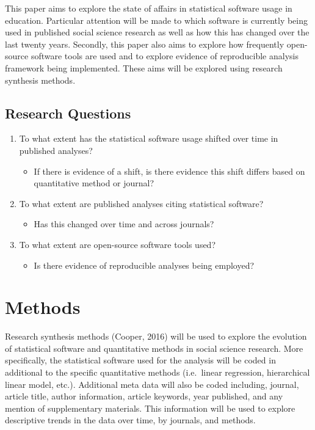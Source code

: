 \documentclass[english,man]{apa6}
\providecommand{\tightlist}{%
  \setlength{\itemsep}{0pt}\setlength{\parskip}{0pt}}
\newcounter{author}
\theoremstyle{definition}
\theoremstyle{definition}
\theoremstyle{definition}
\theoremstyle{remark}
\begin{document}
This paper aims to explore the state of affairs in statistical software
usage in education. Particular attention will be made to which software
is currently being used in published social science research as well as
how this has changed over the last twenty years. Secondly, this paper
also aims to explore how frequently open-source software tools are used
and to explore evidence of reproducible analysis framework being
implemented. These aims will be explored using research synthesis
methods.

\hypertarget{research-questions}{%
\subsection{Research Questions}\label{research-questions}}

\begin{enumerate}
\def\labelenumi{\arabic{enumi}.}
\tightlist
\item
  To what extent has the statistical software usage shifted over time in
  published analyses?

  \begin{itemize}
  \tightlist
  \item
    If there is evidence of a shift, is there evidence this shift
    differs based on quantitative method or journal?
  \end{itemize}
\item
  To what extent are published analyses citing statistical software?

  \begin{itemize}
  \tightlist
  \item
    Has this changed over time and across journals?
  \end{itemize}
\item
  To what extent are open-source software tools used?

  \begin{itemize}
  \tightlist
  \item
    Is there evidence of reproducible analyses being employed?
  \end{itemize}
\end{enumerate}

\hypertarget{methods}{%
\section{Methods}\label{methods}}

Research synthesis methods (Cooper, 2016) will be used to explore the
evolution of statistical software and quantitative methods in social
science research. More specifically, the statistical software used for
the analysis will be coded in additional to the specific quantitative
methods (i.e.~linear regression, hierarchical linear model, etc.).
Additional meta data will also be coded including, journal, article
title, author information, article keywords, year published, and any
mention of supplementary materials. This information will be used to
explore descriptive trends in the data over time, by journals, and
methods.
\end{document}
